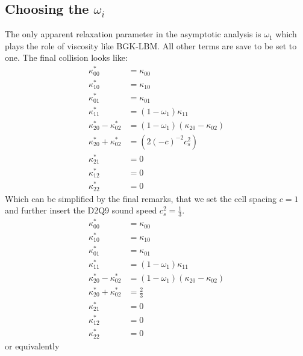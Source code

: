 \subsection{Choosing the \texorpdfstring{$\omega_i$}{omegai}}
\label{sub:Choosing the omega i}
The only apparent relaxation parameter in the asymptotic analysis is $\omega_1$ which plays the role of viscosity like BGK-LBM.\@
All other terms are save to be set to one.
The final collision looks like:
\begin{equation}
  \begin{aligned}
    \kappa_{00}^{*} & = \kappa_{00} \\
    \kappa_{10}^{*} & = \kappa_{10} \\
    \kappa_{01}^{*} & = \kappa_{01} \\
    \kappa_{11}^{*} & = (1-\omega_1)\kappa_{11} \\
    \kappa_{20}^{*} - \kappa_{02}^{*}
      & = (1-\omega_1) (\kappa_{20} - \kappa_{02}) \\
    \kappa_{20}^{*} + \kappa_{02}^{*}
      & = \left( 2 {(-c)}^{-2} c_s^2 \right) \\
    \kappa_{21}^{*} & = 0 \\
    \kappa_{12}^{*} & = 0 \\
    \kappa_{22}^{*} & = 0
  \end{aligned}
\end{equation}
Which can be simplified by the final remarks, that we set the cell spacing $c=1$ and further insert the D2Q9 sound speed $c_s^2=\frac{1}{3}$.
\begin{equation}
  \begin{aligned}
    \kappa_{00}^{*} & = \kappa_{00} \\
    \kappa_{10}^{*} & = \kappa_{10} \\
    \kappa_{01}^{*} & = \kappa_{01} \\
    \kappa_{11}^{*} & = (1-\omega_1)\kappa_{11} \\
    \kappa_{20}^{*} - \kappa_{02}^{*}
      & = (1-\omega_1) (\kappa_{20} - \kappa_{02}) \\
    \kappa_{20}^{*} + \kappa_{02}^{*}
      & =  \frac{2}{3} \\
    \kappa_{21}^{*} & = 0 \\
    \kappa_{12}^{*} & = 0 \\
    \kappa_{22}^{*} & = 0
  \end{aligned}
\end{equation}
or equivalently
